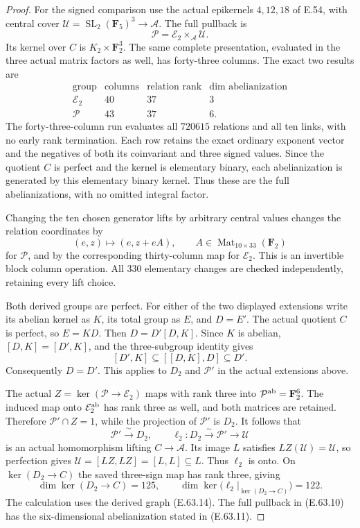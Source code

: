 \begin{proof}
For the signed comparison use the actual epikernels
$4,12,18$ of E.54, with central cover
$\mathcal U=\operatorname{SL}_2(\mathbf F_5)^3\to\mathcal A$.
The full pullback is
\[
               \mathcal P=\mathcal E_2\times_{\mathcal A}\mathcal U.
 \tag{E.63.10}
\]
Its kernel over $C$ is $K_2\times\mathbf F_2^3$.
The same complete presentation, evaluated in the
three actual matrix factors as well, has forty-three
columns. The exact two results are
\[
 \begin{array}{c|r|r|r}
 \text{group}&\text{columns}&\text{relation rank}
                                     &\dim\text{ abelianization}\\\hline
 \mathcal E_2&40&37&3\\
 \mathcal P&43&37&6.
 \end{array}
 \tag{E.63.11}
\]
The forty-three-column run evaluates all $720615$
relations and all ten links, with no early rank
termination. Each row retains the exact ordinary
exponent vector and the negatives of both its
coinvariant and three signed values. Since the
quotient $C$ is perfect and the kernel is elementary
binary, each abelianization is generated by this
elementary binary kernel. Thus these are the full
abelianizations, with no omitted integral factor.

Changing the ten chosen generator lifts by arbitrary
central values changes the relation coordinates by
\[
 (e,z)\longmapsto(e,z+eA),\qquad
 A\in\operatorname{Mat}_{10\times33}(\mathbf F_2)
 \tag{E.63.12}
\]
for $\mathcal P$, and by the corresponding thirty-column
map for $\mathcal E_2$. This is an invertible block
column operation. All $330$ elementary changes are
checked independently, retaining every lift choice.

Both derived groups are perfect. For either of the
two displayed extensions write its abelian kernel
as $K$, its total group as $E$, and $D=E'$.
The actual quotient $C$ is perfect, so $E=KD$.
Then $D=D'[D,K]$. Since $K$ is abelian,
$[D,K]=[D',K]$, and the three-subgroup identity gives
\[
            [D',K]\subseteq[[D,K],D]\subseteq D'.
 \tag{E.63.13}
\]
Consequently $D=D'$. This applies to $D_2$ and
$\mathcal P'$ in the actual extensions above.

The actual $Z=\ker(\mathcal P\to\mathcal E_2)$ maps
with rank three into $\mathcal P^{\rm ab}=\mathbf F_2^6$.
The induced map onto $\mathcal E_2^{\rm ab}$ has rank
three as well, and both matrices are retained.
Therefore $\mathcal P'\cap Z=1$, while the projection
of $\mathcal P'$ is $D_2$. It follows that
\[
 \mathcal P'\xrightarrow{\ \sim\ }D_2,
 \qquad
 \ell_2:D_2\xrightarrow{\sim}\mathcal P'
                           \longrightarrow\mathcal U
 \tag{E.63.14}
\]
is an actual homomorphism lifting $C\to\mathcal A$.
Its image $L$ satisfies $LZ(\mathcal U)=\mathcal U$,
so perfection gives
$\mathcal U=[LZ,LZ]=[L,L]\subseteq L$.
Thus $\ell_2$ is onto. On $\ker(D_2\to C)$ the
saved three-sign map has rank three, giving
\[
 \dim\ker(D_2\to C)=125,
 \qquad\dim\ker\bigl(\ell_2|_{\ker(D_2\to C)}\bigr)=122.
 \tag{E.63.15}
\]
The calculation uses the derived graph
\textup{(E.63.14)}. The full pullback in
\textup{(E.63.10)} has the six-dimensional
abelianization stated in \textup{(E.63.11)}.


\end{proof}
